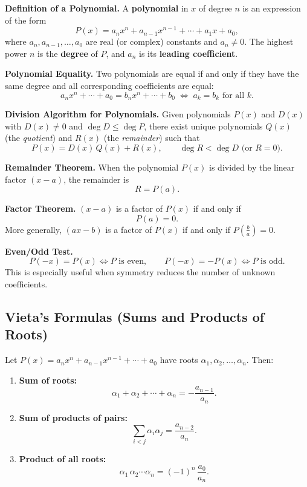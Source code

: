 \documentclass[12pt]{article}
\begin{document}
\textbf{Definition of a Polynomial.}  A \textbf{polynomial} in $x$ of degree $n$ is an expression of the form
\[
  P(x) = a_n x^n + a_{n-1}x^{n-1} + \cdots + a_1 x + a_0,
\]
where $a_n, a_{n-1}, \ldots, a_0$ are real (or complex) constants and $a_n \neq 0$.
The highest power $n$ is the \textbf{degree} of $P$, and $a_n$ is its \textbf{leading coefficient}.

\textbf{Polynomial Equality.}  Two polynomials are equal if and only if they have the same degree and all corresponding coefficients are equal:
\[
  a_n x^n + \cdots + a_0 = b_n x^n + \cdots + b_0
  \;\Longleftrightarrow\;
  a_k = b_k \text{ for all } k.
\]

\textbf{Division Algorithm for Polynomials.} Given polynomials $P(x)$ and $D(x)$ with $D(x) \neq 0$ and $\deg D \leq \deg P$, there exist unique polynomials $Q(x)$ (the \emph{quotient}) and $R(x)$ (the \emph{remainder}) such that
\[
  P(x) = D(x)\,Q(x) + R(x), \qquad \deg R < \deg D \text{ (or } R = 0\text{)}.
\]

\textbf{Remainder Theorem.}  When the polynomial $P(x)$ is divided by the linear factor $(x - a)$, the remainder is
\[
  R = P(a).
\]

\textbf{Factor Theorem.}  $(x - a)$ is a factor of $P(x)$ if and only if
\[
  P(a) = 0.
\]
More generally, $(ax - b)$ is a factor of $P(x)$ if and only if $P\!\left(\tfrac{b}{a}\right) = 0$.

\textbf{Even/Odd Test.}
\[
P(-x)=P(x)\iff P \text{ is even},\qquad
P(-x)=-P(x)\iff P \text{ is odd}.
\]
This is especially useful when symmetry reduces the number of unknown coefficients.

\subsection{Vieta's Formulas (Sums and Products of Roots)}

Let $P(x) = a_n x^n + a_{n-1}x^{n-1} + \cdots + a_0$ have roots $\alpha_1, \alpha_2, \ldots, \alpha_n$. Then:

\begin{enumerate}[leftmargin=*]
  \item \textbf{Sum of roots:}
  \[
    \alpha_1 + \alpha_2 + \cdots + \alpha_n = -\frac{a_{n-1}}{a_n}.
  \]
  \item \textbf{Sum of products of pairs:}
  \[
    \sum_{i<j} \alpha_i\alpha_j = \frac{a_{n-2}}{a_n}.
  \]
  \item \textbf{Product of all roots:}
  \[
    \alpha_1\,\alpha_2\cdots\alpha_n = (-1)^n\,\frac{a_0}{a_n}.
  \]
\end{enumerate}
\end{document}
